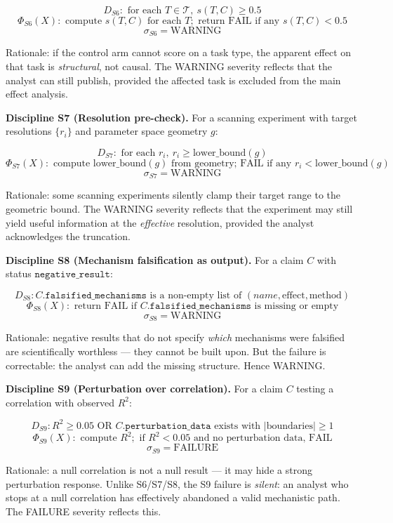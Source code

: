 \documentclass[
]{article}
\begin{document}
\[D_{S6}: \text{ for each } T \in \mathcal{T}, \ s(T, C) \geq 0.5\]
\[\Phi_{S6}(X): \text{ compute } s(T, C) \text{ for each } T; \text{ return FAIL if any } s(T, C) < 0.5\]
\[\sigma_{S6} = \text{WARNING}\]

Rationale: if the control arm cannot score on a task type, the apparent
effect on that task is \emph{structural}, not causal. The WARNING
severity reflects that the analyst can still publish, provided the
affected task is excluded from the main effect analysis.

\textbf{Discipline S7 (Resolution pre-check).} For a scanning experiment
with target resolutions \(\{r_i\}\) and parameter space geometry \(g\):

\[D_{S7}: \text{ for each } r_i, \ r_i \geq \text{lower\_bound}(g)\]
\[\Phi_{S7}(X): \text{ compute } \text{lower\_bound}(g) \text{ from geometry; FAIL if any } r_i < \text{lower\_bound}(g)\]
\[\sigma_{S7} = \text{WARNING}\]

Rationale: some scanning experiments silently clamp their target range
to the geometric bound. The WARNING severity reflects that the
experiment may still yield useful information at the \emph{effective}
resolution, provided the analyst acknowledges the truncation.

\textbf{Discipline S8 (Mechanism falsification as output).} For a claim
\(C\) with status \(\texttt{negative\_result}\):

\[D_{S8}: C.\texttt{falsified\_mechanisms} \text{ is a non-empty list of } (name, \text{effect}, \text{method})\]
\[\Phi_{S8}(X): \text{ return FAIL if } C.\texttt{falsified\_mechanisms} \text{ is missing or empty}\]
\[\sigma_{S8} = \text{WARNING}\]

Rationale: negative results that do not specify \emph{which} mechanisms
were falsified are scientifically worthless --- they cannot be built
upon. But the failure is correctable: the analyst can add the missing
structure. Hence WARNING.

\textbf{Discipline S9 (Perturbation over correlation).} For a claim
\(C\) testing a correlation with observed \(R^2\):

\[D_{S9}: R^2 \geq 0.05 \text{ OR } C.\texttt{perturbation\_data} \text{ exists with } |\text{boundaries}| \geq 1\]
\[\Phi_{S9}(X): \text{ compute } R^2; \text{ if } R^2 < 0.05 \text{ and no perturbation data, FAIL}\]
\[\sigma_{S9} = \text{FAILURE}\]

Rationale: a null correlation is not a null result --- it may hide a
strong perturbation response. Unlike S6/S7/S8, the S9 failure is
\emph{silent}: an analyst who stops at a null correlation has
effectively abandoned a valid mechanistic path. The FAILURE severity
reflects this.
\end{document}
